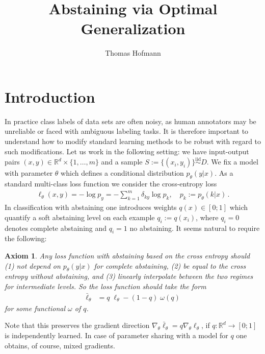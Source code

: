 \documentclass[12pt,a4paper]{article}
\author{Thomas Hofmann}
\title{Abstaining via Optimal Generalization}
\newtheorem{axiom}{Axiom}
\begin{document}
\maketitle

\noindent 

\section{Introduction} 
In practice class labels of data sets are often noisy, as human annotators may be unreliable or faced with ambiguous labeling tasks. It is therefore important to understand how to modify standard learning methods to be robust with regard to such modifications. Let us work in the following setting: we have input-output pairs $(x,y) \in \mathbb R^d \times \{1,\dots,m\}$ and a sample $S:= \{(x_i,y_i)\} \stackrel{\text{iid}} \sim D$. We fix a model with parameter $\theta$ which defines a conditional distribution $p_\theta(y|x)$. As a standard multi-class loss function we consider the cross-entropy loss 
\begin{align}
\ell_\theta(x,y) = -\log p_y = - \sum_{k=1}^m \delta_{ky} \log p_k, \quad p_k := p_\theta(k|x) \,.
\end{align} 
In classification with abstaining one introduces weights $q(x) \in [0;1]$ which quantify a soft abstaining level on each example $q_i :=q(x_i)$, where $q_i=0$ denotes complete abstaining and $q_i=1$ no abstaining.  It seems natural to require the following: 
\begin{axiom}
Any loss function with abstaining based on the cross entropy should (1) not depend on $p_\theta(y|x)$ for complete abstaining, (2) be equal to the cross entropy without abstaining, and (3) linearly interpolate between the two regimes for intermediate levels. So the loss function should take the form
\begin{align}
\bar \ell_\theta & = q \; \ell_\theta - (1-q) \; \omega(q)
\end{align} 
for some functional $\omega$ of $q$.
\end{axiom}
\noindent Note that this preserves the gradient direction $\nabla_\theta \bar\ell_\theta = q \nabla_\theta\ell_\theta$, if $q: \mathbb R^d \to [0;1]$ is independently learned. In case of parameter sharing with a model for $q$ one obtains, of course, mixed gradients. 

\end{document}
